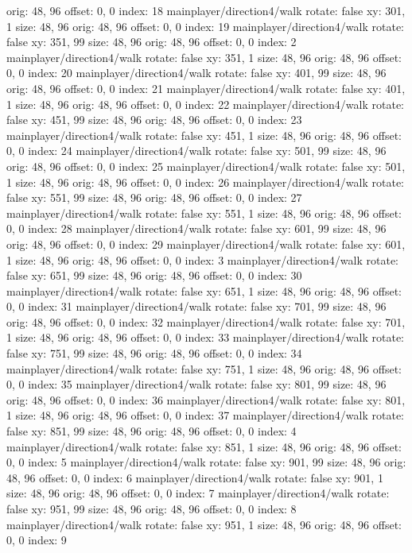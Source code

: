   orig: 48, 96
  offset: 0, 0
  index: 18
mainplayer/direction4/walk
  rotate: false
  xy: 301, 1
  size: 48, 96
  orig: 48, 96
  offset: 0, 0
  index: 19
mainplayer/direction4/walk
  rotate: false
  xy: 351, 99
  size: 48, 96
  orig: 48, 96
  offset: 0, 0
  index: 2
mainplayer/direction4/walk
  rotate: false
  xy: 351, 1
  size: 48, 96
  orig: 48, 96
  offset: 0, 0
  index: 20
mainplayer/direction4/walk
  rotate: false
  xy: 401, 99
  size: 48, 96
  orig: 48, 96
  offset: 0, 0
  index: 21
mainplayer/direction4/walk
  rotate: false
  xy: 401, 1
  size: 48, 96
  orig: 48, 96
  offset: 0, 0
  index: 22
mainplayer/direction4/walk
  rotate: false
  xy: 451, 99
  size: 48, 96
  orig: 48, 96
  offset: 0, 0
  index: 23
mainplayer/direction4/walk
  rotate: false
  xy: 451, 1
  size: 48, 96
  orig: 48, 96
  offset: 0, 0
  index: 24
mainplayer/direction4/walk
  rotate: false
  xy: 501, 99
  size: 48, 96
  orig: 48, 96
  offset: 0, 0
  index: 25
mainplayer/direction4/walk
  rotate: false
  xy: 501, 1
  size: 48, 96
  orig: 48, 96
  offset: 0, 0
  index: 26
mainplayer/direction4/walk
  rotate: false
  xy: 551, 99
  size: 48, 96
  orig: 48, 96
  offset: 0, 0
  index: 27
mainplayer/direction4/walk
  rotate: false
  xy: 551, 1
  size: 48, 96
  orig: 48, 96
  offset: 0, 0
  index: 28
mainplayer/direction4/walk
  rotate: false
  xy: 601, 99
  size: 48, 96
  orig: 48, 96
  offset: 0, 0
  index: 29
mainplayer/direction4/walk
  rotate: false
  xy: 601, 1
  size: 48, 96
  orig: 48, 96
  offset: 0, 0
  index: 3
mainplayer/direction4/walk
  rotate: false
  xy: 651, 99
  size: 48, 96
  orig: 48, 96
  offset: 0, 0
  index: 30
mainplayer/direction4/walk
  rotate: false
  xy: 651, 1
  size: 48, 96
  orig: 48, 96
  offset: 0, 0
  index: 31
mainplayer/direction4/walk
  rotate: false
  xy: 701, 99
  size: 48, 96
  orig: 48, 96
  offset: 0, 0
  index: 32
mainplayer/direction4/walk
  rotate: false
  xy: 701, 1
  size: 48, 96
  orig: 48, 96
  offset: 0, 0
  index: 33
mainplayer/direction4/walk
  rotate: false
  xy: 751, 99
  size: 48, 96
  orig: 48, 96
  offset: 0, 0
  index: 34
mainplayer/direction4/walk
  rotate: false
  xy: 751, 1
  size: 48, 96
  orig: 48, 96
  offset: 0, 0
  index: 35
mainplayer/direction4/walk
  rotate: false
  xy: 801, 99
  size: 48, 96
  orig: 48, 96
  offset: 0, 0
  index: 36
mainplayer/direction4/walk
  rotate: false
  xy: 801, 1
  size: 48, 96
  orig: 48, 96
  offset: 0, 0
  index: 37
mainplayer/direction4/walk
  rotate: false
  xy: 851, 99
  size: 48, 96
  orig: 48, 96
  offset: 0, 0
  index: 4
mainplayer/direction4/walk
  rotate: false
  xy: 851, 1
  size: 48, 96
  orig: 48, 96
  offset: 0, 0
  index: 5
mainplayer/direction4/walk
  rotate: false
  xy: 901, 99
  size: 48, 96
  orig: 48, 96
  offset: 0, 0
  index: 6
mainplayer/direction4/walk
  rotate: false
  xy: 901, 1
  size: 48, 96
  orig: 48, 96
  offset: 0, 0
  index: 7
mainplayer/direction4/walk
  rotate: false
  xy: 951, 99
  size: 48, 96
  orig: 48, 96
  offset: 0, 0
  index: 8
mainplayer/direction4/walk
  rotate: false
  xy: 951, 1
  size: 48, 96
  orig: 48, 96
  offset: 0, 0
  index: 9


